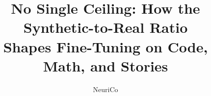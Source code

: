 \documentclass{article}
\title{No Single Ceiling: How the Synthetic-to-Real Ratio\\ Shapes Fine-Tuning on Code, Math, and Stories}
\author{NeuriCo}
\begin{document}
\maketitle

\begin{abstract}

\end{abstract}










\appendix

\end{document}
